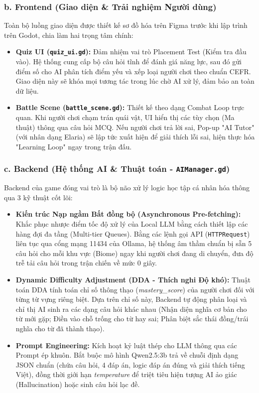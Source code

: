 \subsubsection*{b. Frontend (Giao diện \& Trải nghiệm Người dùng)}
Toàn bộ luồng giao diện được thiết kế sơ đồ hóa trên Figma trước khi lập trình trên Godot, chia làm hai trọng tâm chính:
\begin{itemize}
	\item \textbf{Quiz UI (\texttt{quiz\_ui.gd}):} Đảm nhiệm vai trò Placement Test (Kiểm tra đầu vào). Hệ thống cung cấp bộ câu hỏi tĩnh để đánh giá năng lực, sau đó gửi điểm số cho AI phân tích điểm yếu và xếp loại người chơi theo chuẩn CEFR. Giao diện này sẽ khóa mọi tương tác trong lúc chờ AI xử lý, đảm bảo an toàn dữ liệu.
    \item \textbf{Battle Scene (\texttt{battle\_scene.gd}):} Thiết kế theo dạng Combat Loop trực quan. Khi người chơi chạm trán quái vật, UI hiển thị các tùy chọn (Ma thuật) thông qua câu hỏi MCQ. Nếu người chơi trả lời sai, Pop-up "AI Tutor" (với nhân dạng Elaria) sẽ lập tức xuất hiện để giải thích lỗi sai, hiện thực hóa "Learning Loop" ngay trong trận đấu.
\end{itemize}

\subsubsection*{c. Backend (Hệ thống AI \& Thuật toán - \texttt{AIManager.gd})}
Backend của game đóng vai trò là bộ não xử lý logic học tập cá nhân hóa thông qua 3 kỹ thuật cốt lõi:
\begin{itemize}
    \item \textbf{Kiến trúc Nạp ngầm Bất đồng bộ (Asynchronous Pre-fetching):} Khắc phục nhược điểm tốc độ xử lý của Local LLM bằng cách thiết lập các hàng đợi đa tầng (Multi-tier Queues). Bằng các lệnh gọi API (\texttt{HTTPRequest}) liên tục qua cổng mạng 11434 của Ollama, hệ thống âm thầm chuẩn bị sẵn 5 câu hỏi cho mỗi khu vực (Biome) ngay khi người chơi đang di chuyển, đưa độ trễ tải câu hỏi trong trận chiến về mức 0 giây.
    \item \textbf{Dynamic Difficulty Adjustment (DDA - Thích nghi Độ khó):} Thuật toán DDA tính toán chỉ số thông thạo (\textit{mastery\_score}) của người chơi đối với từng từ vựng riêng biệt. Dựa trên chỉ số này, Backend tự động phân loại và chỉ thị AI sinh ra các dạng câu hỏi khác nhau (Nhận diện nghĩa cơ bản cho từ mới gặp; Điền vào chỗ trống cho từ hay sai; Phân biệt sắc thái đồng/trái nghĩa cho từ đã thành thạo).
    \item \textbf{Prompt Engineering:} Kích hoạt kỷ luật thép cho LLM thông qua các Prompt ép khuôn. Bắt buộc mô hình Qwen2.5:3b trả về chuỗi định dạng JSON chuẩn (chứa câu hỏi, 4 đáp án, logic đáp án đúng và giải thích tiếng Việt), đồng thời giới hạn \textit{temperature} để triệt tiêu hiện tượng AI ảo giác (Hallucination) hoặc sinh câu hỏi lạc đề.
\end{itemize}

